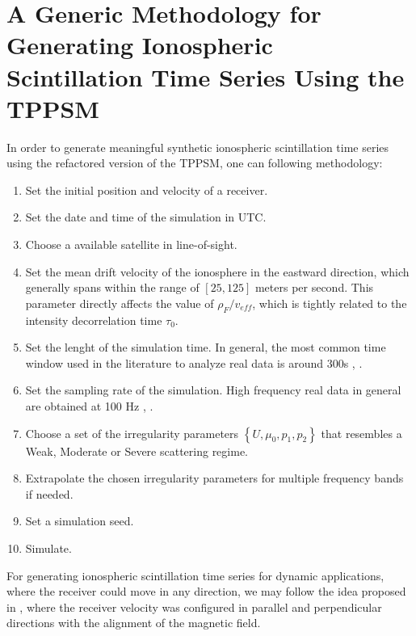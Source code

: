 \section{A Generic Methodology for Generating Ionospheric Scintillation Time Series Using the TPPSM}
\label{sec:time_series_methodology}
In order to generate meaningful synthetic ionospheric scintillation time series using the refactored version of the TPPSM, one can following methodology:

\begin{enumerate}
    \item Set the initial position and velocity of a receiver.
    \item Set the date and time of the simulation in UTC.
    \item Choose a available satellite in line-of-sight.
    \item Set the mean drift velocity of the ionosphere in the eastward direction, which generally spans within the range of $\left[ 25, 125 \right]$ meters per second. This parameter directly affects the value of $\rho_F / v_{eff}$, which is tightly related to the intensity decorrelation time $\tau_0$.
    \item Set the lenght of the simulation time. In general, the most common time window used in the literature to analyze real data is around 300s \cite[Figure 2]{xuTwoparameterMultifrequencyGPS2020}, \cite[Figure 3]{JiaoScintillationOnGPSSignalsForDynamicPlatforms2018}.
    \item Set the sampling rate of the simulation. High frequency real data in general are obtained at 100 Hz \cite[Section 5]{xuTwoparameterMultifrequencyGPS2020}, \cite[Section IV, subsection A]{JiaoMultifrequencyScintillationOnGPSSignalsStaticPlatforms2018}.
    \item Choose a set of the irregularity parameters $\left\{ U, \mu_0, p_1, p_2 \right\}$ that resembles a Weak, Moderate or Severe scattering regime.
    \item Extrapolate the chosen irregularity parameters for multiple frequency bands if needed.
    \item Set a simulation seed.
    \item Simulate.
\end{enumerate}

For generating ionospheric scintillation time series for dynamic applications, where the receiver could move in any direction, we may follow the idea proposed in \cite[Figure 4]{JiaoScintillationOnGPSSignalsForDynamicPlatforms2018}, where the receiver velocity was configured in parallel and perpendicular directions with the alignment of the magnetic field.

